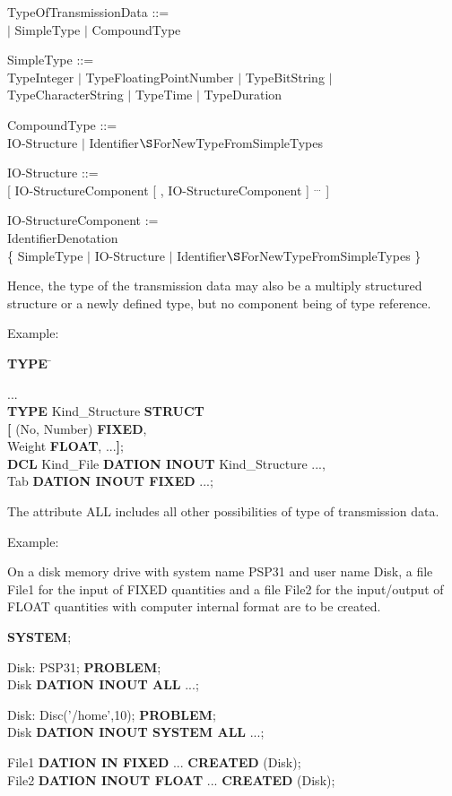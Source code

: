 TypeOfTransmissionData ::=\\
 $\mid$ SimpleType $\mid$ CompoundType

SimpleType ::= \\
\x TypeInteger $\mid$ TypeFloatingPointNumber $\mid$ TypeBitString $\mid$\\
\x TypeCharacterString $\mid$ TypeTime $\mid$ TypeDuration

CompoundType ::= \\
\x IO-Structure $\mid$ Identifier$\S $ForNewTypeFromSimpleTypes

IO-Structure ::=\\
 [ IO-StructureComponent [ , IO-StructureComponent ] $^{...}$ ]

IO-StructureComponent := \\
\x IdentifierDenotation\\
\x \{ SimpleType $\mid$ IO-Structure $\mid$ Identifier$\S $ForNewTypeFromSimpleTypes \}

Hence, the type of the transmission data may also be a multiply
structured structure or a newly defined type, but no component being of
type reference.

Example:

\begin{tabbing}
{\bf TYPE} \= \kill

...        \> \\
{\bf TYPE} \> Kind\_Structure {\bf STRUCT} \\
    \> {\bf [} (No, Number) {\bf FIXED},\\
    \> \x Weight {\bf FLOAT}, ...{\bf ]};\\
{\bf DCL}  \> Kind\_File {\bf DATION INOUT} Kind\_Structure ...,\\
    \> Tab {\bf DATION INOUT FIXED} ...;
\end{tabbing}

The attribute ALL includes all other possibilities of type of
transmission data.

Example:

On a disk memory drive with system name PSP31 and user name Disk, a file
File1 for the input of FIXED quantities and a file File2 for the
input/output of FLOAT quantities with computer internal format are to be
created.

{\bf SYSTEM};\\
\begin{removed}
\x Disk: PSP31;
{\bf PROBLEM};\\
 Disk {\bf DATION INOUT ALL} ...;\\
\end{removed}
\begin{added}
\x Disk: Disc('/home',10);
{\bf PROBLEM};\\
 Disk {\bf DATION INOUT SYSTEM ALL} ...;\\
\end{added}
 File1 {\bf DATION IN FIXED} ... {\bf CREATED} (Disk);\\
 File2 {\bf DATION INOUT FLOAT} ... {\bf CREATED} (Disk);

